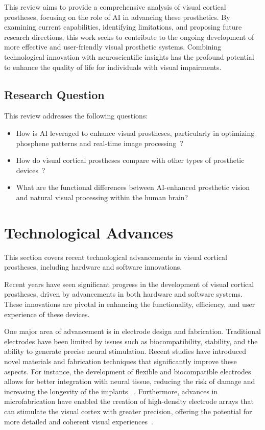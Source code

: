 \documentclass[twocolumn,10pt]{article}
\begin{document}
This review aims to provide a comprehensive analysis of visual cortical
prostheses, focusing on the role of AI in advancing these prosthetics. By
examining current capabilities, identifying limitations, and proposing future
research directions, this work seeks to contribute to the ongoing development of
more effective and user-friendly visual prosthetic systems. Combining
technological innovation with neuroscientific insights has the profound
potential to enhance the quality of life for individuals with visual
impairments.

\subsection{Research Question}
This review addresses the following questions:
\begin{itemize}
    \item How is AI leveraged to enhance visual prostheses, particularly in
          optimizing phosphene patterns and real-time image
          processing~\cite{farnumNewVisionVisual2020}?
    \item How do visual cortical prostheses compare with other types of
          prosthetic devices~\cite{graniPersonalizedClosedloopStimulation2022}?
    \item What are the functional differences between AI-enhanced prosthetic
          vision and natural visual processing within the human brain?
\end{itemize}

\section{Technological Advances}\label{sec:tech_advances}
This section covers recent technological advancements in visual cortical
prostheses, including hardware and software innovations.

Recent years have seen significant progress in the development of visual
cortical prostheses, driven by advancements in both hardware and software
systems. These innovations are pivotal in enhancing the functionality,
efficiency, and user experience of these devices.

One major area of advancement is in electrode design and fabrication.
Traditional electrodes have been limited by issues such as biocompatibility,
stability, and the ability to generate precise neural stimulation. Recent
studies have introduced novel materials and fabrication techniques that
significantly improve these aspects. For instance, the development of flexible
and biocompatible electrodes allows for better integration with neural tissue,
reducing the risk of damage and increasing the longevity of the implants
~\cite{xiangFlexibleThreedimensionalElectrode2016}. Furthermore, advances in
microfabrication have enabled the creation of high-density electrode arrays that
can stimulate the visual cortex with greater precision, offering the potential
for more detailed and coherent visual
experiences~\cite{ryuSpatiallyConfinedResponses2020}.
\end{document}
